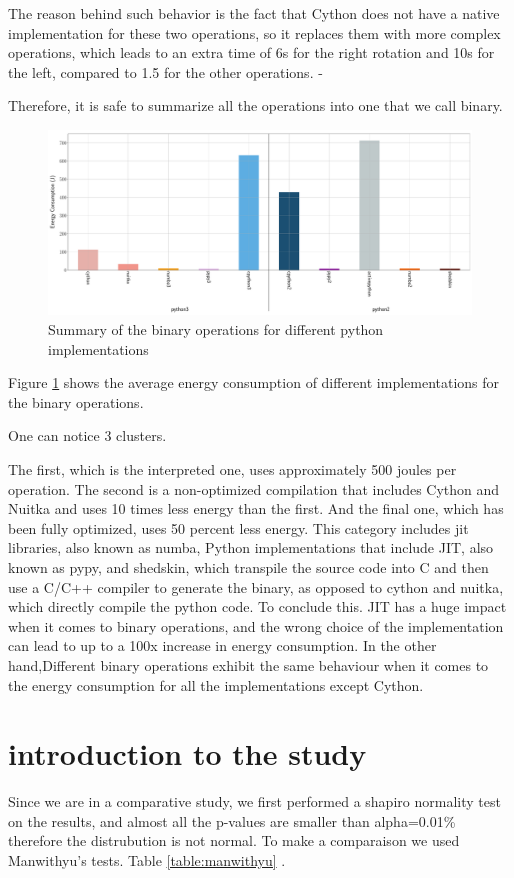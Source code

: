The reason behind such behavior is the fact that Cython does not have a native implementation for these two operations, so it replaces them with more complex operations, which leads to an extra time of 6s for the right rotation and 10s for the left, compared to 1.5 for the other operations. -

Therefore, it is safe to summarize all the operations into one that we call binary.

\begin{figure}
    \centering
    \includegraphics[width=\linewidth]{imgs/bitopts_mean}
    \caption{Summary of the binary operations for different python implementations }
    \label{figure:bitops}
\end{figure}
Figure \ref{figure:bitops}  shows the average energy consumption of different implementations for the binary operations.

One can notice 3 clusters.

The first, which is the interpreted one, uses approximately 500 joules per operation. The second is a non-optimized compilation that includes Cython and Nuitka and uses 10 times less energy than the first. And the final one, which has been fully optimized, uses 50 percent less energy. This category includes jit libraries, also known as numba, Python implementations that include JIT, also known as pypy, and shedskin, which transpile the source code into C and then use a C/C++ compiler to generate the binary, as opposed to cython and nuitka, which directly compile the python code.
To conclude this. JIT has a huge impact when it comes to binary operations, and the wrong choice of the implementation can lead to up to a 100x increase in energy consumption. In the other hand,Different binary operations exhibit the same behaviour when it comes to the energy consumption for all the implementations except Cython.

\section{introduction to the study}
Since we are in a comparative study, we first performed a shapiro normality test on the results, and almost all the p-values are  smaller than alpha=0.01\% therefore the distrubution is not normal. To make a comparaison we used Manwithyu's tests.
Table \ref{table:manwithyu} .


